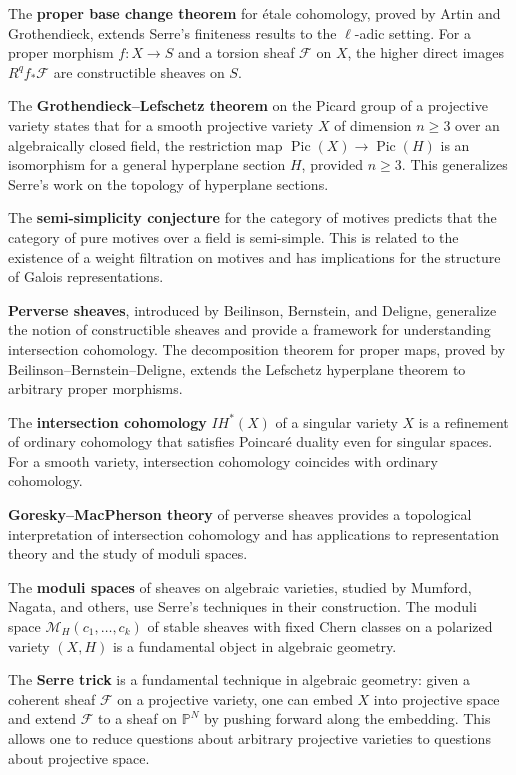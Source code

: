 The \textbf{proper base change theorem} for étale cohomology, proved by Artin and Grothendieck, extends Serre's finiteness results to the $\ell$-adic setting. For a proper morphism $f: X \to S$ and a torsion sheaf $\mathcal{F}$ on $X$, the higher direct images $R^q f_* \mathcal{F}$ are constructible sheaves on $S$.

The \textbf{Grothendieck--Lefschetz theorem} on the Picard group of a projective variety states that for a smooth projective variety $X$ of dimension $n \geq 3$ over an algebraically closed field, the restriction map $\operatorname{Pic}(X) \to \operatorname{Pic}(H)$ is an isomorphism for a general hyperplane section $H$, provided $n \geq 3$. This generalizes Serre's work on the topology of hyperplane sections.

The \textbf{semi-simplicity conjecture} for the category of motives predicts that the category of pure motives over a field is semi-simple. This is related to the existence of a weight filtration on motives and has implications for the structure of Galois representations.

\textbf{Perverse sheaves}, introduced by Beilinson, Bernstein, and Deligne, generalize the notion of constructible sheaves and provide a framework for understanding intersection cohomology. The decomposition theorem for proper maps, proved by Beilinson--Bernstein--Deligne, extends the Lefschetz hyperplane theorem to arbitrary proper morphisms.

The \textbf{intersection cohomology} $IH^*(X)$ of a singular variety $X$ is a refinement of ordinary cohomology that satisfies Poincaré duality even for singular spaces. For a smooth variety, intersection cohomology coincides with ordinary cohomology.

\textbf{Goresky--MacPherson theory} of perverse sheaves provides a topological interpretation of intersection cohomology and has applications to representation theory and the study of moduli spaces.

The \textbf{moduli spaces} of sheaves on algebraic varieties, studied by Mumford, Nagata, and others, use Serre's techniques in their construction. The moduli space $\mathcal{M}_H(c_1, \ldots, c_k)$ of stable sheaves with fixed Chern classes on a polarized variety $(X, H)$ is a fundamental object in algebraic geometry.

The \textbf{Serre trick} is a fundamental technique in algebraic geometry: given a coherent sheaf $\mathcal{F}$ on a projective variety, one can embed $X$ into projective space and extend $\mathcal{F}$ to a sheaf on $\mathbb{P}^N$ by pushing forward along the embedding. This allows one to reduce questions about arbitrary projective varieties to questions about projective space.

